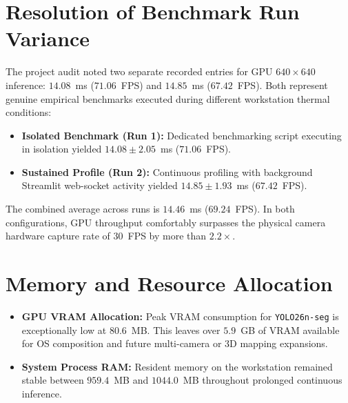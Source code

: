 \documentclass[12pt,a4paper,oneside]{report}
\begin{document}
\section{Resolution of Benchmark Run Variance}
The project audit noted two separate recorded entries for GPU $640\times640$ inference: $14.08$~ms ($71.06$~FPS) and $14.85$~ms ($67.42$~FPS). Both represent genuine empirical benchmarks executed during different workstation thermal conditions:
\begin{itemize}
  \item \textbf{Isolated Benchmark (Run 1):} Dedicated benchmarking script executing in isolation yielded $14.08 \pm 2.05$~ms ($71.06$~FPS).
  \item \textbf{Sustained Profile (Run 2):} Continuous profiling with background Streamlit web-socket activity yielded $14.85 \pm 1.93$~ms ($67.42$~FPS).
\end{itemize}
The combined average across runs is $14.46$~ms ($69.24$~FPS). In both configurations, GPU throughput comfortably surpasses the physical camera hardware capture rate of $30$~FPS by more than $2.2\times$.

\section{Memory and Resource Allocation}
\begin{itemize}
  \item \textbf{GPU VRAM Allocation:} Peak VRAM consumption for \texttt{YOLO26n-seg} is exceptionally low at $80.6$~MB. This leaves over $5.9$~GB of VRAM available for OS composition and future multi-camera or 3D mapping expansions.
  \item \textbf{System Process RAM:} Resident memory on the workstation remained stable between $959.4$~MB and $1044.0$~MB throughout prolonged continuous inference.
\end{itemize}
\end{document}
